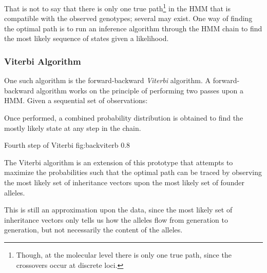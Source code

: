 That is not to say that there is only one true path\footnote{Though, at the molecular level there is only one true path, since the crossovers  occur at discrete loci.} in the HMM that is compatible with the observed genotypes; several may exist.  One way of finding the optimal path is to run an inference algorithm through the HMM chain to find the most likely sequence of states given a likelihood.


\subsubsection{Viterbi Algorithm}

One such algorithm is the forward-backward \textit{Viterbi} algorithm. A forward-backward algorithm works on the principle of performing two passes upon a HMM. Given a sequential set of observations:

\begin{enumerate}[labelsep=2em, align=right, labelwidth=3em, labelindent=4em, leftmargin=*]
\end{enumerate}

Once performed, a combined probability distribution is obtained to find the mostly likely state at any step in the chain.

	{Fourth step of Viterbi}
	{fig:backviterb}
	{0.8}


The Viterbi algorithm is an extension of this prototype that attempts to maximize the probabilities such that the optimal path can be traced by observing the most likely set of inheritance vectors upon the most likely set of founder alleles.

This is still an approximation upon the data, since the most likely set of inheritance vectors only tells us how the alleles flow from generation to generation, but not necessarily the content of the alleles.





